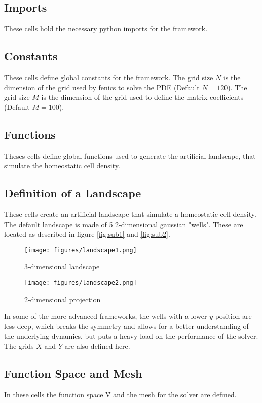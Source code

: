 \documentclass[11pt, oneside]{article}   	%
\begin{document}
\subsection{Imports}
These cells hold the necessary python imports for the framework. 
\subsection{Constants}
These cells define global constants for the framework.
The grid size $N$ is the dimension of the grid used by fenics to solve the PDE (Default $N = 120$).
The grid size $M$ is the dimension of the grid used to define the matrix coefficients (Default $M = 100$).
\subsection{Functions}
Theses cells define global functions used to generate the artificial landscape, that simulate the homeostatic cell density.
\subsection{Definition of a Landscape}
These cells create an artificial landscape that simulate a homeostatic cell density. \newline
The default landscape is made of 5 2-dimensional gaussian "wells". These are located as described in figure \ref{fig:sub1} and \ref{fig:sub2}.

\begin{figure}[h]
\centering
\begin{minipage}{.5\textwidth}
	\centering
	\texttt{[image: figures/landscape1.png]}
	\caption{3-dimensional landscape}
	\label{fig:sub1}
\end{minipage}%
\begin{minipage}{.5\textwidth}
	\centering
	\texttt{[image: figures/landscape2.png]}
	\caption{2-dimensional projection}
	\label{fig:sub2}
\end{minipage}
\label{fig:landscape}
\end{figure}
In some of the more advanced frameworks, the wells with a lower $y$-position are less deep, which breaks the symmetry and allows for a better understanding of the underlying dynamics, but puts a heavy load on the performance of the solver.
The grids $X$ and $Y$ are also defined here. 
\subsection{Function Space and Mesh}
In these cells the function space \^{V} and the mesh for the solver are defined.
\end{document}
